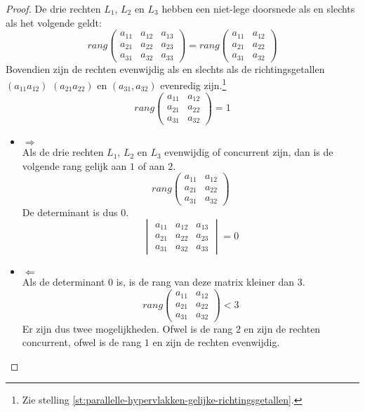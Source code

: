 \documentclass[main.tex]{subfiles}
\begin{document}
\begin{lem}
  \begin{proof}
    De drie rechten $L_{1}$, $L_{2}$ en $L_{3}$ hebben een niet-lege doorsnede als en slechts als het volgende geldt:
    \[
    rang
    \begin{pmatrix}
    a_{11} & a_{12} & a_{13}\\
    a_{21} & a_{22} & a_{23}\\
    a_{31} & a_{32} & a_{33}
    \end{pmatrix}
    =
    rang
    \begin{pmatrix}
    a_{11} & a_{12}\\
    a_{21} & a_{22}\\
    a_{31} & a_{32}
    \end{pmatrix}
    \]
    Bovendien zijn de rechten evenwijdig als en slechts als de richtingsgetallen $(a_{11} a_{12})$ $(a_{21} a_{22})$ en $(a_{31}, a_{32})$ evenredig zijn.\footnote{Zie stelling \ref{st:parallelle-hypervlakken-gelijke-richtingsgetallen}.}
    \[
    rang
    \begin{pmatrix}
    a_{11} & a_{12}\\
    a_{21} & a_{22}\\
    a_{31} & a_{32}
    \end{pmatrix}
    = 1
    \]
    \begin{itemize}
    \item $\Rightarrow$\\
      Als de drie rechten $L_{1}$, $L_{2}$ en $L_{3}$ evenwijdig of concurrent zijn, dan is de volgende rang gelijk aan $1$ of aan $2$. 
      \[
      rang
      \begin{pmatrix}
        a_{11} & a_{12}\\
        a_{21} & a_{22}\\
        a_{31} & a_{32}
      \end{pmatrix}
      \]
      De determinant is dus $0$.
      \[
      \begin{vmatrix}
        a_{11} & a_{12} & a_{13}\\
        a_{21} & a_{22} & a_{23}\\
        a_{31} & a_{32} & a_{33}
      \end{vmatrix}
      = 0
      \]
    \item $\Leftarrow$\\
      Als de determinant $0$ is, is de rang van deze matrix kleiner dan $3$.
      \[
      rang
      \begin{pmatrix}
        a_{11} & a_{12}\\
        a_{21} & a_{22}\\
        a_{31} & a_{32}
      \end{pmatrix}
      < 3
      \]
      Er zijn dus twee mogelijkheden. Ofwel is de rang $2$ en zijn de rechten concurrent, ofwel is de rang $1$ en zijn de rechten evenwijdig.
    \end{itemize}
  \end{proof}
\end{lem}
\end{document}
